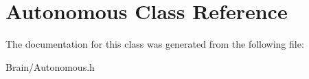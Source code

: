 \hypertarget{class_autonomous}{
\section{\-Autonomous \-Class \-Reference}
\label{class_autonomous}
}


\-The documentation for this class was generated from the following file\-:\begin{DoxyCompactItemize}
\item 
\-Brain/\-Autonomous.\-h\end{DoxyCompactItemize}
